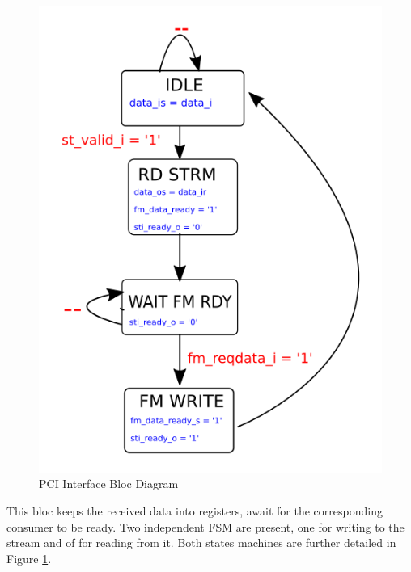 \begin{minipage}[t]{0.45\textwidth}
\begin{figure}[H]
    \centering
    \includegraphics[scale = 0.4]{Figures/PCI_INTFCE_FSM.png}
    \caption{PCI Interface Bloc Diagram}
    \label{fig:pci_fsm}
\end{figure}
\end{minipage}
\hfill
\begin{minipage}[t]{0.3\textwidth}
This bloc keeps the received data into registers, await for the corresponding consumer to be ready. Two independent FSM are present, one for writing to the stream and of for reading from it. Both states machines are further detailed in Figure \ref{fig:pci_fsm}.
\end{minipage}


